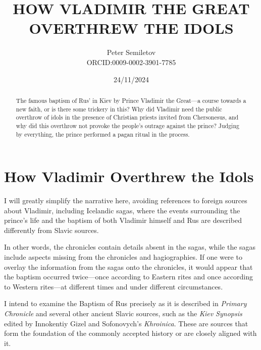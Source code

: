\documentclass[a5paper,11pt,openany]{article}
\title{HOW VLADIMIR THE GREAT\\OVERTHREW THE IDOLS\\
\textsmaller[2]{edition 1.0}}
\author{Peter Semiletov\\ORCID:0009-0002-3901-7785 \orcidlink{0009-0002-3901-7785}}
\date{24/11/2024}
\begin{document}
\pagestyle{empty}

\maketitle

\newpage

\pagestyle{plain}


%
%
%


\begin{abstract}
The famous baptism of Rus' in Kiev by Prince Vladimir the Great—a course towards a new faith, or is there some trickery in this? Why did Vladimir need the public overthrow of idols in the presence of Christian priests invited from Chersonesus, and why did this overthrow not provoke the people's outrage against the prince? Judging by everything, the prince performed a pagan ritual in the process.
\end{abstract}


\section{How Vladimir Overthrew the Idols}

I will greatly simplify the narrative here, avoiding references to foreign sources about Vladimir, including Icelandic sagas, where the events surrounding the prince's life and the baptism of both Vladimir himself and Rus are described differently from Slavic sources.

In other words, the chronicles contain details absent in the sagas, while the sagas include aspects missing from the chronicles and hagiographies. If one were to overlay the information from the sagas onto the chronicles, it would appear that the baptism occurred twice—once according to Eastern rites and once according to Western rites—at different times and under different circumstances.

I intend to examine the Baptism of Rus precisely as it is described in \textit{Primary Chronicle}\cite{ipat} and several other ancient Slavic sources, such as the \textit{Kiev Synopsis}\cite{sinopsis} edited by Innokentiy Gizel and Sofonovych's \textit{Khroinica}\cite{sofonovich01}. These are sources that form the foundation of the commonly accepted history or are closely aligned with it.
\end{document}
